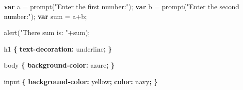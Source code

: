 \documentclass[]{memoir}
\newenvironment{Shaded}{}{}
\newcommand{\KeywordTok}[1]{\textcolor[rgb]{0.00,0.44,0.13}{\textbf{{#1}}}}
\newcommand{\DataTypeTok}[1]{\textcolor[rgb]{0.56,0.13,0.00}{{#1}}}
\newcommand{\StringTok}[1]{\textcolor[rgb]{0.25,0.44,0.63}{{#1}}}
\newcommand{\FunctionTok}[1]{\textcolor[rgb]{0.02,0.16,0.49}{{#1}}}
\newcommand{\NormalTok}[1]{{#1}}
\begin{document}
\begin{Shaded}
\begin{Highlighting}[]
\KeywordTok{var} \NormalTok{a = }\FunctionTok{prompt}\NormalTok{(}\StringTok{"Enter the first number:"}\NormalTok{);}
\KeywordTok{var} \NormalTok{b = }\FunctionTok{prompt}\NormalTok{(}\StringTok{"Enter the second number:"}\NormalTok{);}
\KeywordTok{var} \NormalTok{sum = a+b;}

\FunctionTok{alert}\NormalTok{(}\StringTok{"There sum is: "}\NormalTok{+sum);}
\end{Highlighting}
\end{Shaded}


\begin{Shaded}
\begin{Highlighting}[]
\NormalTok{h1 }\KeywordTok{\{}
    \KeywordTok{text-decoration:} \DataTypeTok{underline}\KeywordTok{;}
\KeywordTok{\}}
\end{Highlighting}
\end{Shaded}


\begin{Shaded}
\begin{Highlighting}[]
\NormalTok{body }\KeywordTok{\{}
    \KeywordTok{background-color:} \NormalTok{azure}\KeywordTok{;}
\KeywordTok{\}}
\end{Highlighting}
\end{Shaded}


\begin{Shaded}
\begin{Highlighting}[]
\NormalTok{input }\KeywordTok{\{}
    \KeywordTok{background-color:} \DataTypeTok{yellow}\KeywordTok{;}
    \KeywordTok{color:} \DataTypeTok{navy}\KeywordTok{;}
\KeywordTok{\}}
\end{Highlighting}
\end{Shaded}
\end{document}
